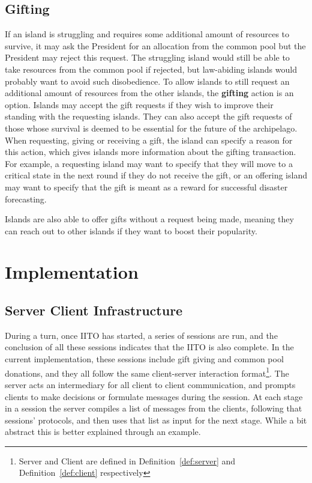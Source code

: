\subsection{Gifting}  
\label{subsec:IITO:gifting}  

If an island is struggling and requires some additional amount of resources to survive, it may ask the President for an allocation from the common pool but the President may reject this request. The struggling island would still be able to take resources from the common pool if rejected, but law-abiding islands would probably want to avoid such disobedience. To allow islands to still request an additional amount of resources from the other islands, the \textbf{gifting} action is an option. Islands may accept the gift requests if they wish to improve their standing with the requesting islands. They can also accept the gift requests of those whose survival is deemed to be essential for the future of the archipelago. When requesting, giving or receiving a gift, the island can specify a reason for this action, which gives islands more information about the gifting transaction. For example, a requesting island may want to specify that they will move to a critical state in the next round if they do not receive the gift, or an offering island may want to specify that the gift is meant as a reward for successful disaster forecasting.

Islands are also able to offer gifts without a request being made, meaning they can reach out to other islands if they want to boost their popularity.

\section{Implementation}
\label{sec:IITO:Implementation}

\subsection{Server Client Infrastructure}
\label{subsec:IITO:server_client_infrastructure}  

During a turn, once IITO has started, a series of sessions are run, and the conclusion of all these sessions indicates that the IITO is also complete. In the current implementation, these sessions include gift giving and common pool donations, and they all follow the same client-server interaction format\footnote{Server and Client are defined in Definition~\ref{def:server} and Definition~\ref{def:client} respectively}. The server acts an intermediary for all client to client communication, and prompts clients to make decisions or formulate messages during the session. At each stage in a session the server compiles a list of messages from the clients, following that sessions' protocols, and then uses that list as input for the next stage. While a bit abstract this is better explained through an example.

